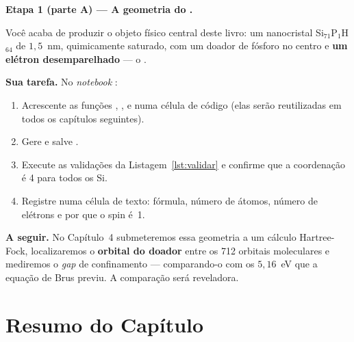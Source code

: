 \begin{caixaancora}
\textbf{Etapa 1 (parte A) --- A geometria do \qubit{}.}

Você acaba de produzir o objeto físico central deste livro: um nanocristal
Si$_{71}$P$_1$H$_{64}$ de $1{,}5$~nm, quimicamente saturado, com um doador de
fósforo no centro e \textbf{um elétron desemparelhado} --- o \qubit{}.

\vspace{0.3cm}
\textbf{Sua tarefa.} No \emph{notebook} :
\begin{enumerate}[leftmargin=*,nosep]
  \item Acrescente as funções , ,
         e  numa célula de código
        (elas serão reutilizadas em todos os capítulos seguintes).
  \item Gere e salve .
  \item Execute as validações da Listagem~\ref{lst:validar} e confirme que a
        coordenação é 4 para todos os Si.
  \item Registre numa célula de texto: fórmula, número de átomos, número de
        elétrons e por que o spin é~1.
\end{enumerate}

\vspace{0.3cm}
\textbf{A seguir.} No Capítulo~4 submeteremos essa geometria a um cálculo
Hartree-Fock, localizaremos o \textbf{orbital do doador} entre os 712 orbitais
moleculares e mediremos o \emph{gap} de confinamento --- comparando-o com os
$5{,}16$~eV que a equação de Brus previu. A comparação será reveladora.
\end{caixaancora}

\section*{Resumo do Capítulo}

